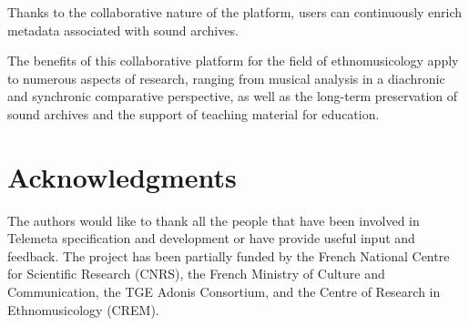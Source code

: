 \documentclass{sig-alternate}
\begin{document}
Thanks to the collaborative nature of the platform, users can continuously enrich metadata associated with sound archives. 

The benefits of this collaborative platform for the field of ethnomusicology apply to numerous aspects of research, ranging from musical analysis in a diachronic and synchronic comparative perspective, as well as the long-term preservation of sound archives and the support of teaching material for education. 


\section{Acknowledgments}
The authors would like to thank all the people that have been involved in Telemeta specification and development or have provide useful input and feedback. 
The project has been partially funded by the French National Centre for Scientific Research (CNRS), the French Ministry of Culture and Communication, the TGE Adonis Consortium, and the Centre of Research in Ethnomusicology (CREM).





\end{document}
